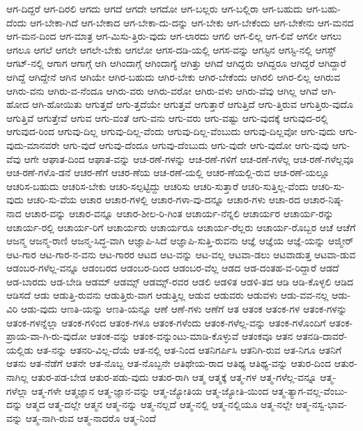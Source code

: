{ಆಗ-ದಿದ್ದರೆ
ಆಗ-ದಿರಲಿ
ಆಗದು
ಆಗದೆ
ಆಗದೇ
ಆಗದೋ
ಆಗ-ಬಲ್ಲರು
ಆಗ-ಬಲ್ಲಿರಾ
ಆಗ-ಬಹುದು
ಆಗ-ಬಹು-ದೆಂದು
ಆಗ-ಬೇಕಾ-ಗಿದೆ
ಆಗ-ಬೇಕಾದ
ಆಗ-ಬೇಕಾ-ದು-ದನ್ನು
ಆಗ-ಬೇಕು
ಆಗ-ಬೇಕೆಂದು
ಆಗ-ಬೇಕೇನು
ಆಗ-ಮನದ
ಆಗ-ಮನ-ದಿಂದ
ಆಗ-ಮಾತ್ರ
ಆಗ-ಮಿಸು-ತ್ತಿರು-ವುದು
ಆಗ-ಲಾರದು
ಆಗಲಿ
ಆಗ-ಲಿಲ್ಲ
ಆಗ-ಲಿವೆ
ಆಗಲೀ
ಆಗಲು
ಆಗಲೂ
ಆಗಲೆ
ಆಗಲೇ
ಆಗಲೇ-ಬೇಕು
ಆಗಲೋ
ಆಗಸ-ದಡಿ-ಯಲ್ಲಿ
ಆಗಸ-ವನ್ನು
ಆಗಸ್ಟಿನ
ಆಗಸ್ಟಿ-ನಲ್ಲಿ
ಆಗಸ್ಟ್
ಆಗಟ್-ನಲ್ಲಿ
ಆಗಾಗ
ಆಗಾಗ್ಗೆ
ಆಗಿ
ಆಗಿಂದಾಗ್ಗೆ
ಆಗಿಂದಾಗ್ಯೆ
ಆಗಿತ್ತು
ಆಗಿದೆ
ಆಗಿದ್ದರು
ಆಗಿದ್ದರೂ
ಆಗಿದ್ದರೆ
ಆಗಿದ್ದಾರೆ
ಆಗಿದ್ದೆ
ಆಗಿದ್ದೇನೆ
ಆಗಿನ
ಆಗಿಯೇ
ಆಗಿರ-ಬಹುದು
ಆಗಿರ-ಬೇಕು
ಆಗಿರ-ಬೇಕೆಂದು
ಆಗಿರಲಿ
ಆಗಿರ-ಲಿಲ್ಲ
ಆಗಿರುವ
ಆಗಿರು-ವನು
ಆಗಿರು-ವ-ನೆಂದೂ
ಆಗಿರು-ವರು
ಆಗಿರು-ವರೋ
ಆಗಿರು-ವಳು
ಆಗಿರು-ವೆವು
ಆಗಿಲ್ಲ
ಆಗಿವೆ
ಆಗಿ-ಹೋದ
ಆಗಿ-ಹೋಯಿತು
ಆಗುತ್ತದೆ
ಆಗು-ತ್ತದೆಯೇ
ಆಗುತ್ತವೆ
ಆಗುತ್ತಾರೆ
ಆಗುತ್ತಿದೆ
ಆಗು-ತ್ತಿರುವ
ಆಗುತ್ತಿರು-ವುದೊ
ಆಗುತ್ತಿವೆ
ಆಗುತ್ತೇವೆ
ಆಗುವ
ಆಗು-ವಂತೆ
ಆಗು-ವನು
ಆಗು-ವರು
ಆಗು-ವಷ್ಟು
ಆಗು-ವುದಕ್ಕೆ
ಆಗುವುದ-ರಲ್ಲಿ
ಆಗುವುದ-ರಿಂದ
ಆಗುವು-ದಿಲ್ಲ
ಆಗುವು-ದಿಲ್ಲ-ವೆಂದು
ಆಗುವು-ದಿಲ್ಲ-ವೆಂಬುದು
ಆಗುವು-ದಿಲ್ಲವೋ
ಆಗು-ವುದು
ಆಗು-ವುದು-ಮಾನವರೇ
ಆಗು-ವುದೆ
ಆಗುವು-ದೆಂದೂ
ಆಗುವು-ದೆಂಬುದು
ಆಗು-ವುದೇ
ಆಗು-ವುದೋ
ಆಗು-ವುವು
ಆಗು-ವೆವು
ಆಗೇ
ಆಘಾತ-ದಿಂದ
ಆಘಾತ-ವನ್ನು
ಆಚ-ರಣೆ-ಗಳನ್ನು
ಆಚ-ರಣೆ-ಗಳಿಗೆ
ಆಚ-ರಣೆ-ಗಳೆಲ್ಲ
ಆಚ-ರಣೆ-ಗಳೆಲ್ಲವೂ
ಆಚ-ರಣೆ-ಗಳೊ-ಡನೆ
ಆಚರ-ಣೆಗೆ
ಆಚರ-ಣೆಯ
ಆಚ-ರಣೆ-ಯಲ್ಲಿ
ಆಚರ-ಣೆಯಲ್ಲಿ-ರುವ
ಆಚ-ರಣೆ-ಯಲ್ಲೂ
ಆಚರಿಸ-ಬಹುದು
ಆಚರಿಸ-ಬೇಕು
ಆಚರಿ-ಸಲ್ಪಟ್ಟಿದ್ದು
ಆಚರಿಸು
ಆಚರಿ-ಸುತ್ತಾರೆ
ಆಚರಿ-ಸುತ್ತಿಲ್ಲ-ವೆಂದು
ಆಚರಿ-ಸು-ವುದು
ಆಚರಿ-ಸು-ವೆಯ
ಆಚಾರ
ಆಚಾರ-ಗಳಲ್ಲಿ
ಆಚಾರ-ಗಳಾ-ವು-ದನ್ನೂ
ಆಚಾರ-ಗಳು
ಆಚಾ-ರದ
ಆಚಾರ-ನಿಷ್ಠ-ನಾದ
ಆಚಾರ-ವನ್ನು
ಆಚಾರ-ವನ್ನೂ
ಆಚಾರ-ಶೀಲ-ರಿ-ಗಿಂತ
ಆಚಾರ್ಯ-ನೆನ್ನಲಿ
ಆಚಾರ್ಯರ
ಆಚಾರ್ಯ-ರನ್ನು
ಆಚಾರ್ಯ-ರಲ್ಲಿ
ಆಚಾರ್ಯ-ರಿಗೆ
ಆಚಾರ್ಯರು
ಆಚಾರ್ಯರೂ
ಆಚಾರ್ಯ-ರೆಲ್ಲರು
ಆಚಾರ್ಯ-ರೊಬ್ಬರ
ಆಚೆ
ಆಚೆಗೆ
ಆಜನ್ಮ
ಆಜನ್ಮ-ರಾಣಿ
ಆಜನ್ಮ-ಸಿದ್ಧ-ವಾಗಿ
ಆಜ್ಞಾಪಿ-ಸಿದೆ
ಆಜ್ಞಾಪಿ-ಸುತ್ತಿ-ರುವನು
ಆಜ್ಞೆ
ಆಜ್ಞೆಯ
ಆಜ್ಞೆ-ಯನ್ನು
ಆಜ್ಮೀರ್
ಆಟ-ಗಾರ
ಆಟ-ಗಾರ-ನ-ವನು
ಆಟ-ಗಾರರ
ಆಟದ
ಆಟ-ವನ್ನು
ಆಟ-ವಲ್ಲ
ಆಟವಾ-ಡಲು
ಆಟವಾಡುತ್ತ
ಆಟವಾ-ಡುವ
ಆಡಂಬರ-ಗಳೆಲ್ಲ-ವನ್ನೂ
ಆಡಂಬರದ
ಆಡಂಬರ-ದಿಂದ
ಆಡಂಬರ-ವೆಲ್ಲ
ಆಡದ
ಆಡ-ದಂತಹ-ವ-ರಿದ್ದಾರೆ
ಆಡದೆ
ಆಡ-ಬಾರದು
ಆಡ-ಬೇಡಿ
ಆಡಮ್
ಆಡಮ್ಸ್
ಆಡಮ್ಸ್-ರವರ
ಆಡಲಿ
ಆಡಳಿತ
ಆಡಳಿ-ತದ
ಆಡಿ
ಆಡಿ-ಕೊಳ್ಳಲಿ
ಆಡಿದ
ಆಡಿಸದೆ
ಆಡು
ಆಡುತ್ತಿ-ರುವನು
ಆಡುತ್ತಿರು-ವಾಗ
ಆಡುತ್ತಿಲ್ಲ
ಆಡುವ
ಆಡುವರು
ಆಡುವಳು
ಆಡು-ವವ-ನಲ್ಲ
ಆಡು-ವಿರಿ
ಆಡು-ವುದು
ಆಣತಿ-ಯನ್ನು
ಆಣತಿ-ಯನ್ನೂ
ಆಣೆ
ಆಣೆ-ಗಳು
ಆಣೆಗೆ
ಆತ
ಆತಂಕ
ಆತಂಕ-ಗಳ
ಆತಂಕ-ಗಳನ್ನು
ಆತಂಕ-ಗಳನ್ನೆಲ್ಲಾ
ಆತಂಕ-ಗಳಿಂದ
ಆತಂಕ-ಗಳೂ
ಆತಂಕ-ಗಳೆಂದು
ಆತಂಕ-ಗಳೆಲ್ಲ-ವನ್ನು
ಆತಂಕ-ಗಳೊಂದಿಗೆ
ಆತಂಕ-ಪ್ರಾಯ-ವಾ-ಗಿ-ರು-ವುದೋ
ಆತಂಕ-ವನ್ನು
ಆತಂಕ-ವನ್ನುಂಟು-ಮಾಡಿ-ಕೊಳ್ಳುವೆ
ಆತಂಕವೂ
ಆತನ
ಆತನಡಿ-ದಾವರೆ-ಯಲ್ಲಿಡು
ಆತ-ನನ್ನು
ಆತನರಿ-ವಿಲ್ಲ-ದೆಯೆ
ಆತ-ನಲ್ಲಿ
ಆತ-ನಿಂದ
ಆತನಿಗರ್ಪಿಸಿ
ಆತನಿಗಿ-ರುವ
ಆತ-ನಿಗೂ
ಆತನಿಗೆ
ಆತನು
ಆತ-ನೆಡೆಗೆ
ಆತನೇ
ಆತ-ನೊಬ್ಬ
ಆತ-ನೊಬ್ಬನೇ
ಆತಿಥೇಯ-ರಾದ
ಆತಿಥ್ಯ
ಆತಿಥ್ಯ-ವನ್ನು
ಆತುರ-ದಿಂದ
ಆತುರ-ನಾಗಿಲ್ಲ
ಆತುರ-ಪಡ-ಬೇಡ
ಆತುರ-ಪಡು-ವುದು
ಆತುರ-ರಾಗಿ
ಆತ್ಮ
ಆತ್ಮಕ್ಕೆ
ಆತ್ಮ-ಗಳ
ಆತ್ಮ-ಗಳೆಲ್ಲ-ವನ್ನೂ
ಆತ್ಮ-ಗಳೆಲ್ಲಾ
ಆತ್ಮ-ಗಳೇ
ಆತ್ಮಜ್ಞಾನ
ಆತ್ಮ-ಜ್ಞಾನ-ವನ್ನು
ಆತ್ಮ-ಜ್ಯೋತಿಯ
ಆತ್ಮ-ಜ್ಯೋತಿ-ಯಿಂದ
ಆತ್ಮ-ತ್ಯಾಗ-ವಲ್ಲ-ವೆಂಬು-ದನ್ನು
ಆತ್ಮದ
ಆತ್ಮ-ದಲ್ಲೇ
ಆತ್ಮನ
ಆತ್ಮ-ನನ್ನು
ಆತ್ಮ-ನಲ್ಲದೆ
ಆತ್ಮ-ನಲ್ಲಿ
ಆತ್ಮ-ನಲ್ಲಿಯೂ
ಆತ್ಮ-ನಲ್ಲೇ
ಆತ್ಮ-ನಸ್ವ-ಭಾವ-ವನ್ನು
ಆತ್ಮ-ನಾಗಿ-ರುವ
ಆತ್ಮ-ನಾದರೊ
ಆತ್ಮ-ನಿಂದೆ
}
